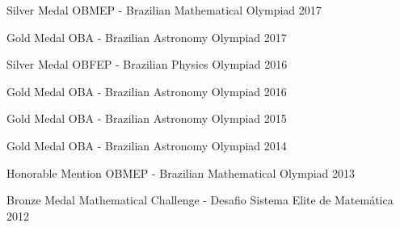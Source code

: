 

\begin{cvhonors}

  \cvhonor
    {Silver Medal} %
    {OBMEP - Brazilian Mathematical Olympiad} %
    {} %
    {2017} %

  \cvhonor
    {Gold Medal} %
    {OBA - Brazilian Astronomy Olympiad} %
    {} %
    {2017} %

  \cvhonor
    {Silver Medal} %
    {OBFEP - Brazilian Physics Olympiad} %
    {} %
    {2016} %

  \cvhonor
    {Gold Medal} %
    {OBA - Brazilian Astronomy Olympiad} %
    {} %
    {2016} %

  \cvhonor
    {Gold Medal} %
    {OBA - Brazilian Astronomy Olympiad} %
    {} %
    {2015} %

  \cvhonor
    {Gold Medal} %
    {OBA - Brazilian Astronomy Olympiad} %
    {} %
    {2014} %

  \cvhonor
    {Honorable Mention} %
    {OBMEP - Brazilian Mathematical Olympiad} %
    {} %
    {2013} %

  \cvhonor
    {Bronze Medal} %
    {Mathematical Challenge - Desafio Sistema Elite de Matemática} %
    {} %
    {2012} %

\end{cvhonors}

